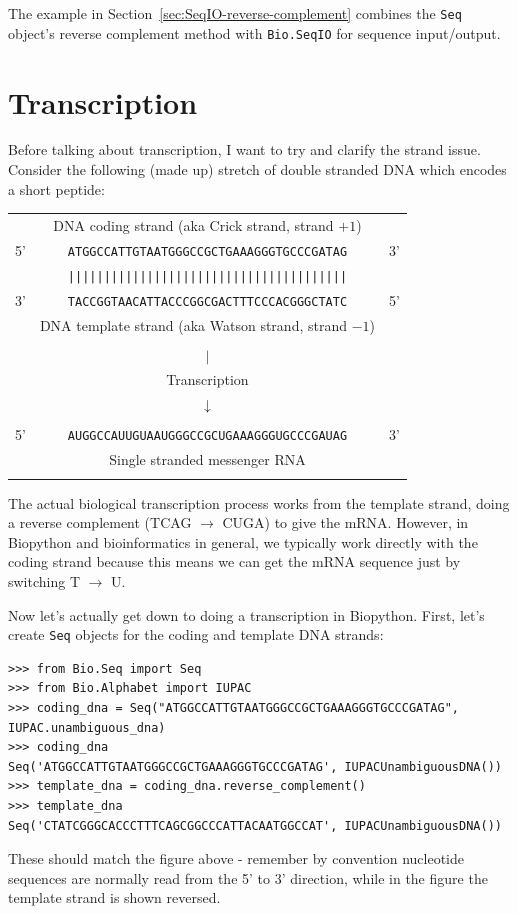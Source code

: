 \documentclass{report}
\begin{document}
The example in Section~\ref{sec:SeqIO-reverse-complement} combines the \verb|Seq|
object's reverse complement method with \verb|Bio.SeqIO| for sequence input/output.

\section{Transcription}
Before talking about transcription, I want to try and clarify the strand issue.
Consider the following (made up) stretch of double stranded DNA which
encodes a short peptide:

\begin{tabular}{rcl}
\\
   & {\small DNA coding strand (aka Crick strand, strand $+1$)} & \\
5' & \texttt{ATGGCCATTGTAATGGGCCGCTGAAAGGGTGCCCGATAG} & 3' \\
   & \texttt{|||||||||||||||||||||||||||||||||||||||} & \\
3' & \texttt{TACCGGTAACATTACCCGGCGACTTTCCCACGGGCTATC} & 5' \\
   & {\small DNA template strand (aka Watson strand, strand $-1$)} & \\
\\
   & {\LARGE $|$} &\\
   & Transcription & \\
   & {\LARGE $\downarrow$} &\\
\\
5' & \texttt{AUGGCCAUUGUAAUGGGCCGCUGAAAGGGUGCCCGAUAG} & 3' \\
   & {\small Single stranded messenger RNA} & \\
\\
\end{tabular}

The actual biological transcription process works from the template strand, doing a reverse complement (TCAG $\rightarrow$ CUGA) to give the mRNA.  However, in Biopython and bioinformatics in general, we typically work directly with the coding strand because this means we can get the mRNA sequence just by switching T $\rightarrow$ U.

Now let's actually get down to doing a transcription in Biopython.  First, let's create \verb|Seq| objects for the coding and template DNA strands:
\begin{verbatim}
>>> from Bio.Seq import Seq
>>> from Bio.Alphabet import IUPAC
>>> coding_dna = Seq("ATGGCCATTGTAATGGGCCGCTGAAAGGGTGCCCGATAG", IUPAC.unambiguous_dna)
>>> coding_dna
Seq('ATGGCCATTGTAATGGGCCGCTGAAAGGGTGCCCGATAG', IUPACUnambiguousDNA())
>>> template_dna = coding_dna.reverse_complement()
>>> template_dna
Seq('CTATCGGGCACCCTTTCAGCGGCCCATTACAATGGCCAT', IUPACUnambiguousDNA())
\end{verbatim}
\noindent These should match the figure above - remember by convention nucleotide sequences are normally read from the 5' to 3' direction, while in the figure the template strand is shown reversed.
\end{document}
